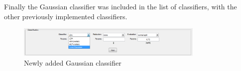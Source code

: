\documentclass[12pt, a4paper, fleqn]{memoir}%
\begin{document}
Finally the Gaussian classifier was included in the list of classifiers, with the other previously implemented classifiers.

\begin{figure}[h]
	\centering
	\includegraphics[width=0.8\textwidth]{aubt4.png}
	\caption{Newly added Gaussian classifier}
	\label{fig:aubt4.jpg}
\end{figure}


\backmatter

\end{document}
